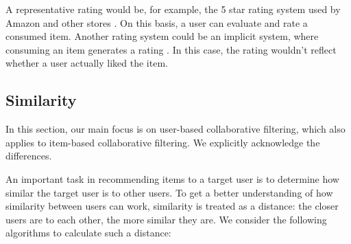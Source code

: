 A representative rating would be, for example, the 5 star rating system used by Amazon and other stores \cite{LU20121, miningOfMassiveDatasets}. On this basis, a user can evaluate and rate a consumed item. Another rating system could be an implicit system, where consuming an item generates a rating \cite{miningOfMassiveDatasets}. In this case, the rating wouldn't reflect whether a user actually liked the item.


\subsection{Similarity}

In this section, our main focus is on user-based collaborative filtering, which also applies to item-based collaborative filtering. We explicitly acknowledge the differences.

An important task in recommending items to a target user is to determine how similar the target user is to other users. To get a better understanding of how similarity between users can work, similarity is treated as a distance: the closer users are to each other, the more similar they are. We consider the following algorithms to calculate such a distance:

